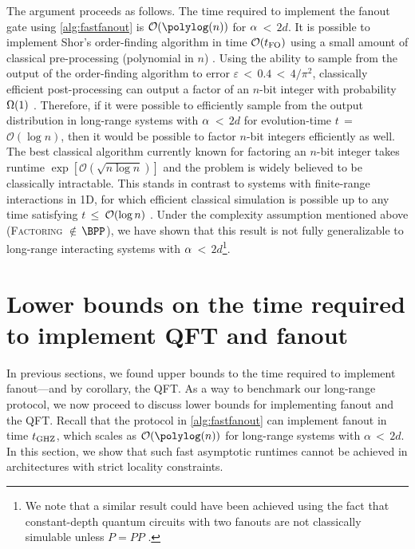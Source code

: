 The argument proceeds as follows.
The time required to implement the fanout gate using \cref{alg:fastfanout} is $\O{\polylog(n)}$ for $\alpha$\,$<$\,$2d$.
It is possible to implement Shor's order-finding algorithm in time $\O{t_\mathrm{FO}}$ using a small amount of classical pre-processing (polynomial in $n$) \cite{Cleve2000,Hoyer2005}.
Using the ability to sample from the output of the order-finding algorithm to error $\varepsilon$\,$<$\,$0.4$\,$<$\,$4/\pi^2$, classically efficient post-processing can output a factor of an $n$-bit integer with probability $\W{1}$ \cite{Shor1997}.
Therefore, if it were possible to efficiently sample from the output distribution in long-range systems with $\alpha$\,$<$\,$2d$ for evolution-time $t$\,$=$\,$\mathcal{O}(\log n)$, then it would be possible to factor $n$-bit integers efficiently as well.
The best classical algorithm currently known for factoring an $n$-bit integer takes runtime $\exp[\mathcal{O}(\sqrt{n \log n})]$ \cite{Lenstra1992} and the problem is widely believed to be classically intractable.
This stands in contrast to systems with finite-range interactions in 1D, for which efficient classical simulation is possible up to any time satisfying $t$\,$\leq$\,$\O{\log n}$ \cite{Osborne2006}.
Under the complexity assumption mentioned above (\textsc{Factoring} $\notin$\,$\BPP$), we have shown that this result is not fully generalizable to long-range interacting systems with $\alpha$\,$<$\,$2d$\footnote{We note that a similar result could have been achieved using the fact that constant-depth quantum circuits with two fanouts are not classically simulable unless $P = PP$ \cite{Takahashi2014}.}.



\section{Lower bounds on the time required to implement QFT and fanout}
In previous sections, we found upper bounds to the time required to implement fanout---and by corollary, the QFT.
As a way to benchmark our long-range protocol, we now proceed to discuss lower bounds for implementing fanout and the QFT.
Recall that the protocol in \cref{alg:fastfanout} can implement fanout in time $t_{\text{GHZ}}$, which scales as $\O{\polylog(n)}$ for long-range systems with $\alpha$\,$<$\,$2d$.
In this section, we show that such fast asymptotic runtimes cannot be achieved in architectures with strict locality constraints.

